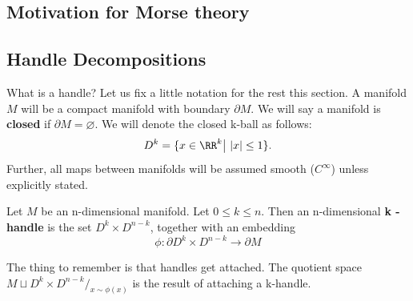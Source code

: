 \subsection{Motivation for Morse theory}

\subsection{Handle Decompositions}
What is a handle? Let us fix a little notation for the rest this section. A manifold $M$ will be a compact manifold with boundary $\partial M$. We will say a manifold is \textbf{closed} if $\partial M = \varnothing$. We will denote the closed k-ball as follows:
\[
D^{k}= \{ x \in \RR^{k} \big| ~|x| \leq 1 \}.
\]
Further, all maps between manifolds will be assumed smooth ($C^{\infty}$) unless explicitly stated.
\begin{definition}
Let $M$ be an n-dimensional manifold. Let $0\leq k \leq n$. Then an n-dimensional \textbf{k - handle} is the set $D^{k} \times D^{n-k}$, together with an embedding 
\[
\phi : \partial D^{k}\times D^{n-k} \rightarrow \partial M
\]
\end{definition}
The thing to remember is that handles get attached. The quotient space $M \sqcup D^{k}\times D^{n-k} /_{x\sim \phi(x)}$ is the result of attaching a k-handle.

